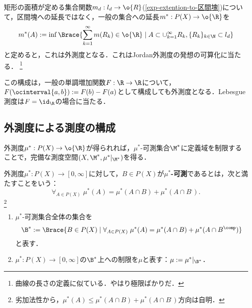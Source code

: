 \documentclass[uplatex, dvipdfmx]{jsreport}
\begin{document}
\begin{example}\label{exp-Lebesgue-outer-measure}
    矩形の面積が定める集合関数$m_d:l_d\to\o{R}$(\ref{exp-extention-to-区間塊})について，区間塊への延長ではなく，一般の集合への延長$m^*:P(X)\to\o{\R}$を
    \[m^*(A):=\inf\Brace{\sum_{k=1}^\infty m(R_k)\in\o{\R}\mid A\subset\cup^\infty_{k=1}R_k,\{R_k\}_{k\in\N}\subset l_d}\]
    と定めると，これは外測度となる．これはJordan外測度の発想の可算化に当たる．
    \footnote{曲線の長さの定義に似ている．やはり極限ばかりだ．}
\end{example}
\begin{example}\label{exp-Lebesgue-Stieltjes-outer-measure}
    この構成は，一般の単調増加関数$F:\R\to\R$について，$F(\ocinterval{a,b}):=F(b)-F(a)$として構成しても外測度となる．Lebesgue測度は$F=\id_\R$の場合に当たる．
\end{example}

\subsection{外測度による測度の構成}

\begin{tcolorbox}[colframe=ForestGreen, colback=ForestGreen!10!white,breakable,colbacktitle=ForestGreen!40!white,coltitle=black,fonttitle=\bfseries\sffamily,
title=]
    外測度$\mu^*:P(X)\to\o{\R}$が得られれば，$\mu^*$-可測集合$\M^*$に定義域を制限することで，完備な測度空間$(X,\M^*,\mu^*|_{\M^*})$を得る．
\end{tcolorbox}

\begin{definition}
    外測度$\mu^*:P(X)\to[0,\infty]$に対して，$B\in P(X)$が\textbf{$\mu^*$-可測}であるとは，次と満たすことをいう：
    \[\forall_{A\in P(X)}\;\mu^*(A)=\mu^*(A\cap B)+\mu^*(A\cap B^\comp).\]\footnote{劣加法性から，$\mu^*(A)\le\mu^*(A\cap B)+\mu^*(A\cap B^\comp)$方向は自明．}
\end{definition}

\begin{notation}\mbox{}
    \begin{enumerate}
        \item $\mu^*$-可測集合全体の集合を\[\B^*:=\Brace{B\in P(X)\mid \forall_{A\in P(X)}\;\mu^*(A)=\mu^*(A\cap B)+\mu^*(A\cap B^\comp)}\]と表す．
        \item $\mu^*:P(X)\to[0,\infty]$の$\B^*$上への制限を$\mu$と表す：$\mu:=\mu^*|_{\B^*}$．
    \end{enumerate}
\end{notation}
\end{document}

